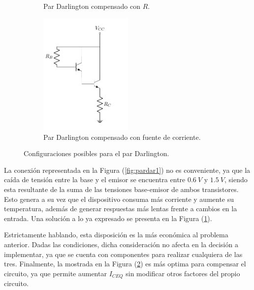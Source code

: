 \begin{figure}[H]
\begin{subfigure}{.4\textwidth}
	\caption{Par Darlington compensado con $R$.}
	\label{fig:pardar2}
\end{subfigure}
\begin{subfigure}{.5\textwidth}
\centering
	\includegraphics[width=0.5\textwidth, page=3]{Imagenes/ParDarlington.pdf}
	\caption{Par Darlington compensado con fuente de corriente.}
	\label{fig:pardar3}
\end{subfigure}
\caption{Configuraciones posibles para el par Darlington.}
\label{fig:pardar}
\end{figure}

La conexión representada en la Figura (\ref{fig:pardar1}) no es conveniente, ya que la caída de tensión entre la base y el emisor se encuentra entre $0.6 \ V$ y $1.5 \ V$, siendo esta resultante de la suma de las tensiones base-emisor de ambos transistores. Esto genera a su vez que el dispositivo consuma más corriente y aumente su temperatura, además de generar respuestas más lentas frente a cambios en la entrada. Una solución a lo ya expresado se presenta en la Figura (\ref{fig:pardar2}).

Estrictamente hablando, esta disposición es la más económica al problema anterior. Dadas las condiciones, dicha consideración no afecta en la decisión a implementar, ya que se cuenta con componentes para realizar cualquiera de las tres. Finalmente, la mostrada en la Figura (\ref{fig:pardar3}) es más optima para compensar el circuito, ya que permite aumentar $I_{CEQ}$ sin modificar otros factores del propio circuito.

